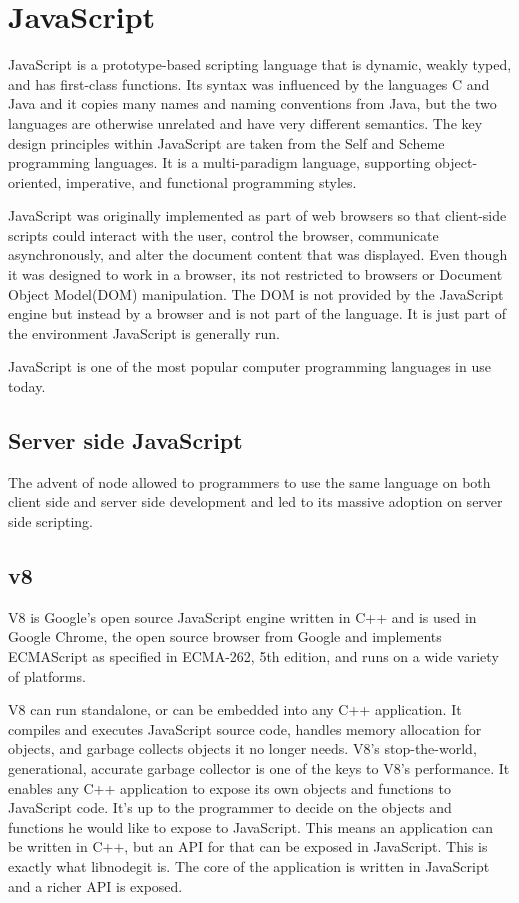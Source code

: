 \section{JavaScript}

JavaScript is a prototype-based scripting language that is dynamic, weakly
typed, and has first-class functions. Its syntax was influenced by the languages
C and Java and it copies many names and naming conventions from Java, but the
two languages are otherwise unrelated and have very different semantics. The key
design principles within JavaScript are taken from the Self and Scheme
programming languages. It is a multi-paradigm language, supporting
object-oriented, imperative, and functional programming styles.

JavaScript was originally implemented as part of web browsers so that
client-side scripts could interact with the user, control the browser,
communicate asynchronously, and alter the document content that was displayed.
Even though it was designed to work in a browser, its not restricted to browsers
or Document Object Model(DOM) manipulation. The DOM is not provided by the
JavaScript engine but instead by a browser and is not part of the language. It
is just part of the environment JavaScript is generally run.

JavaScript is one of the most popular computer programming languages in use
today.

\subsection{Server side JavaScript}

The advent of node allowed to programmers to use the same language on both
client side and server side development and led to its massive adoption on
server side scripting.


\subsection{v8}

V8 is Google\’'s open source JavaScript engine written in C++ and is used in
Google Chrome, the open source browser from Google and implements ECMAScript as
specified in ECMA-262, 5th edition, and runs on a wide variety of platforms.

V8 can run standalone, or can be embedded into any C++ application. It compiles
and executes JavaScript source code, handles memory allocation for objects, and
garbage collects objects it no longer needs. V8’s stop-the-world, generational,
accurate garbage collector is one of the keys to V8’s performance. It enables
any C++ application to expose its own objects and functions to JavaScript code.
It’s up to the programmer to decide on the objects and functions he would like
to expose to JavaScript. This means an application can be written in C++, but an
API for that can be exposed in JavaScript. This is exactly what libnodegit is.
The core of the application is written in JavaScript and a richer API is
exposed.

